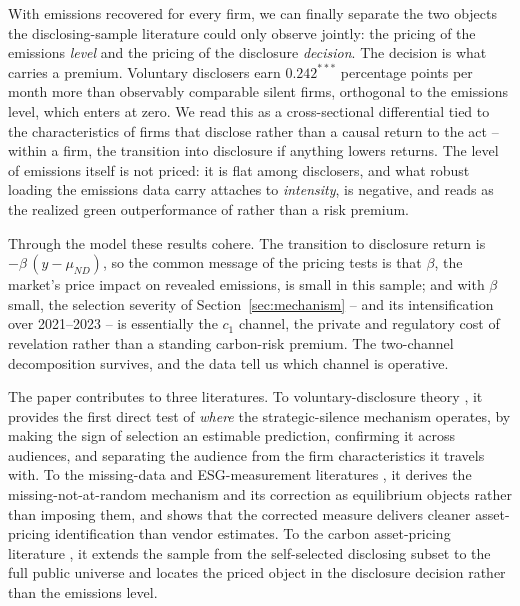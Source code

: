 \documentclass[a4paper,12pt]{article}
\newcommand{\citet}[1]{\textcite{#1}}
\newcommand{\citep}[1]{\parencite{#1}}
\begin{document}
With emissions recovered for every firm, we can finally separate the two objects the disclosing-sample literature could only observe jointly: the pricing of the emissions \emph{level} and the pricing of the disclosure \emph{decision}. The decision is what carries a premium. Voluntary disclosers earn $0.242^{***}$ percentage points per month more than observably comparable silent firms, orthogonal to the emissions level, which enters at zero. We read this as a cross-sectional differential tied to the characteristics of firms that disclose rather than a causal return to the act -- within a firm, the transition into disclosure if anything lowers returns. The level of emissions itself is not priced: it is flat among disclosers, and what robust loading the emissions data carry attaches to \emph{intensity}, is negative, and reads as the realized green outperformance of \citet{pastor2025green} rather than a risk premium.

Through the model these results cohere. The transition to disclosure return is $-\beta\,(y-\mu_{ND})$, so the common message of the pricing tests is that $\beta$, the market's price impact on revealed emissions, is small in this sample; and with $\beta$ small, the selection severity of Section~\ref{sec:mechanism} -- and its intensification over 2021--2023 -- is essentially the $c_1$ channel, the private and regulatory cost of revelation rather than a standing carbon-risk premium. The two-channel decomposition survives, and the data tell us which channel is operative.

The paper contributes to three literatures. To voluntary-disclosure theory \citep{grossman1981informational,milgrom1981good,verrecchia1983discretionary,dye1985disclosure}, it provides the first direct test of \emph{where} the strategic-silence mechanism operates, by making the sign of selection an estimable prediction, confirming it across audiences, and separating the audience from the firm characteristics it travels with. To the missing-data and ESG-measurement literatures \citep{kim2011semiparametric,wang2014instrumental,yang2017semiparametric,olesiewicz2021navigating,chen2025green,duan2025imputation}, it derives the missing-not-at-random mechanism and its correction as equilibrium objects rather than imposing them, and shows that the corrected measure delivers cleaner asset-pricing identification than vendor estimates. To the carbon asset-pricing literature \citep{bolton2021investors,aswani2024carbon,pastor2025green}, it extends the sample from the self-selected disclosing subset to the full public universe and locates the priced object in the disclosure decision rather than the emissions level. 
\end{document}
